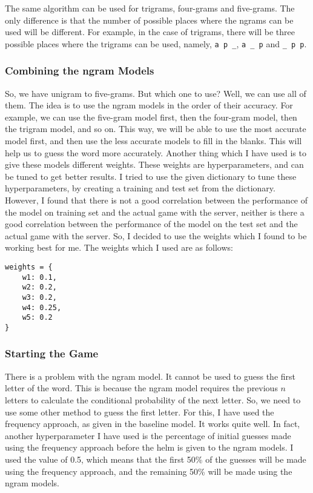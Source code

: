 \documentclass[12pt]{article}
\begin{document}
The same algorithm can be used for trigrams, four-grams and five-grams. The only difference is that the number of possible places where the ngrams can be used will be different. For example, in the case of trigrams, there will be three possible places where the trigrams can be used, namely, \verb|a p _|, \verb|a _ p| and \verb|_ p p|.

\subsubsection{Combining the ngram Models}
So, we have unigram to five-grams. But which one to use? Well, we can use all of them. The idea is to use the ngram models in the order of their accuracy. For example, we can use the five-gram model first, then the four-gram model, then the trigram model, and so on. This way, we will be able to use the most accurate model first, and then use the less accurate models to fill in the blanks. This will help us to guess the word more accurately. Another thing which I have used is to give these models different weights. These weights are hyperparameters, and can be tuned to get better results. I tried to use the given dictionary to tune these hyperparameters, by creating a training and test set from the dictionary. However, I found that there is not a good correlation between the performance of the model on training set and the actual game with the server, neither is there a good correlation between the performance of the model on the test set and the actual game with the server. So, I decided to use the weights which I found to be working best for me. The weights which I used are as follows:

\begin{verbatim}
weights = {
    w1: 0.1,
    w2: 0.2,
    w3: 0.2,
    w4: 0.25,
    w5: 0.2
}
\end{verbatim}

\subsubsection{Starting the Game}
There is a problem with the ngram model. It cannot be used to guess the first letter of the word. This is because the ngram model requires the previous $n$ letters to calculate the conditional probability of the next letter. So, we need to use some other method to guess the first letter. For this, I have used the frequency approach, as given in the baseline model. It works quite well. In fact, another hyperparameter I have used is the percentage of initial guesses made using the frequency approach before the helm is given to the ngram models. I used the value of 0.5, which means that the first 50\% of the guesses will be made using the frequency approach, and the remaining 50\% will be made using the ngram models.
\end{document}

